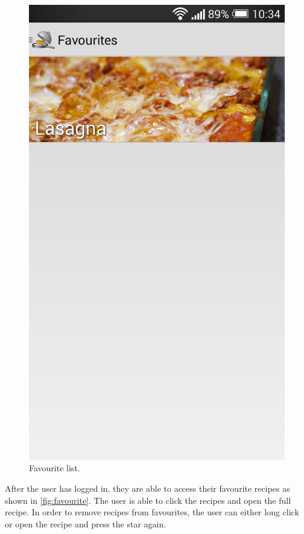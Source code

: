 \begin{figure}[H]
\centering
\begin{minipage}[t]{0.5\columnwidth}
\centering
\includegraphics[width=0.7\columnwidth]{img/screenshots/finalfavourite.png}
\caption{Favourite list\label{fig:favourite}.}
\end{minipage}
\end{figure}

 After the user has logged in, they are able to access their favourite recipes as shown in \autoref{fig:favourite}. The user is able to click the recipes and open the full recipe. In order to remove recipes from favourites, the user can either long click or open the recipe and press the star again.